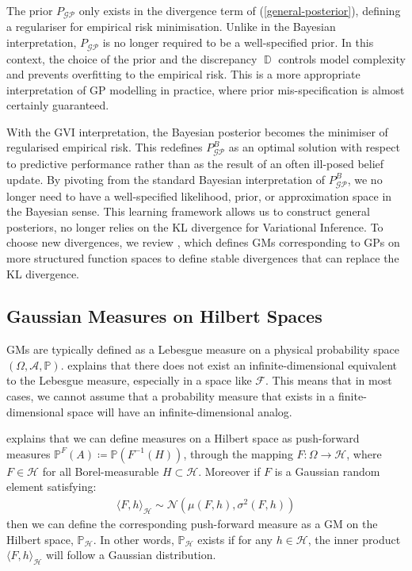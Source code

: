 \documentclass{article}
\newcommand{\D}{\operatorname{\mathbb{D}}}
\newcommand{\GP}{\operatorname{\mathcal{GP}}}
\numberwithin{equation}{section}
\begin{document}
The prior $P_{\GP}$ only exists in the divergence term of (\ref{general-posterior}), defining a regulariser for empirical risk minimisation. Unlike in the Bayesian interpretation, $P_{\GP}$ is no longer required to be a well-specified prior. In this context, the choice of the prior and the discrepancy $\D$ controls model complexity and prevents overfitting to the empirical risk. This is a more appropriate interpretation of GP modelling in practice, where prior mis-specification is almost certainly guaranteed.

With the GVI interpretation, the Bayesian posterior becomes the minimiser of regularised empirical risk. This redefines $P_{\GP}^B$ as an optimal solution with respect to predictive performance rather than as the result of an often ill-posed belief update. By pivoting from the standard Bayesian interpretation of $P_{\GP}^B$, we no longer need to have a well-specified likelihood, prior, or approximation space in the Bayesian sense. This learning framework allows us to construct general posteriors, no longer relies on the KL divergence for Variational Inference. To choose new divergences, we review \cite{wild2022generalized}, which defines GMs corresponding to GPs on more structured function spaces to define stable divergences that can replace the KL divergence.

\subsection{Gaussian Measures on Hilbert Spaces}
GMs are typically defined as a Lebesgue measure on a physical probability space $(\Omega, \mathcal{A}, \mathbb{P})$. \cite{matthews2017scalable} explains that there does not exist an infinite-dimensional equivalent to the Lebesgue measure, especially in a space like $\mathcal{F}$. This means that in most cases, we cannot assume that a  probability measure that exists in a finite-dimensional space will have an infinite-dimensional analog.

\cite{wild2022generalized} explains that we can define measures on a Hilbert space as push-forward measures $\mathbb{P}^{F}(A) \coloneqq \mathbb{P}(F^{-1}(H))$, through the mapping $F: \Omega \rightarrow \mathcal{H}$, where $F \in \mathcal{H}$ for all Borel-measurable $H \subset \mathcal{H}$. Moreover if $F$ is a Gaussian random element satisfying:
\begin{align}
    \langle F, h \rangle_\mathcal{H} \sim \mathcal{N}\left(\mu(F, h), \sigma^2(F, h)\right)
\label{gre}
\end{align}
then we can define the corresponding push-forward measure as a GM on the Hilbert space, $\mathbb{P}_{\mathcal{H}}$. In other words, $\mathbb{P}_{\mathcal{H}}$ exists if for any $h \in \mathcal{H}$, the inner product $\langle F, h \rangle_\mathcal{H}$ will follow a Gaussian distribution. 
\end{document}
